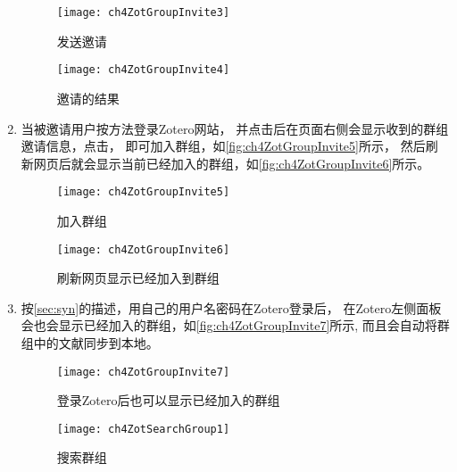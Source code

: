 \documentclass[theorem=false,mathfont=none,openany,sub3section]{easybook}
\begin{document}
\begin{enumerate}
	\begin{figure}[t]
		\begin{minipage}[b]{\dimexpr.5\textwidth-1em}
			\centering
			\texttt{[image: ch4ZotGroupInvite3]}
			\caption{发送邀请}
			\label{fig:ch4ZotGroupInvite3}
		\end{minipage}
		\begin{minipage}[b]{\dimexpr.5\textwidth-1em}
			\centering
			\texttt{[image: ch4ZotGroupInvite4]}
			\caption{邀请的结果}
			\label{fig:ch4ZotGroupInvite4}
		\end{minipage}
	\end{figure}
	\item 当被邀请用户按方法登录Zotero网站，
	并点击后在页面右侧会显示收到的群组邀请信息，点击，
	即可加入群组，如\autoref{fig:ch4ZotGroupInvite5}所示，
	然后刷新网页后就会显示当前已经加入的群组，如\autoref{fig:ch4ZotGroupInvite6}所示。
	\begin{figure}[t]
		\begin{minipage}[b]{\dimexpr.5\textwidth-1em}
			\centering
			\texttt{[image: ch4ZotGroupInvite5]}
			\caption{加入群组}
			\label{fig:ch4ZotGroupInvite5}
		\end{minipage}
		\begin{minipage}[b]{\dimexpr.5\textwidth-1em}
			\centering
			\texttt{[image: ch4ZotGroupInvite6]}
			\caption{刷新网页显示已经加入到群组}
			\label{fig:ch4ZotGroupInvite6}
		\end{minipage}
	\end{figure}
	\item 按\cref{sec:syn}的描述，用自己的用户名密码在Zotero登录后，
	在Zotero左侧面板会也会显示已经加入的群组，如\autoref{fig:ch4ZotGroupInvite7}所示,
	而且会自动将群组中的文献同步到本地。
	\begin{figure}[t]
		\begin{minipage}[b]{\dimexpr.5\textwidth-1em}
			\centering
			\texttt{[image: ch4ZotGroupInvite7]}
			\caption{登录Zotero后也可以显示已经加入的群组}
			\label{fig:ch4ZotGroupInvite7}
		\end{minipage}
		\begin{minipage}[b]{\dimexpr.5\textwidth-1em}
			\centering
			\texttt{[image: ch4ZotSearchGroup1]}
			\caption{搜索群组}
			\label{fig:ch4ZotSearchGroup1}
		\end{minipage}
	\end{figure}
	
\end{enumerate}
\end{document}
